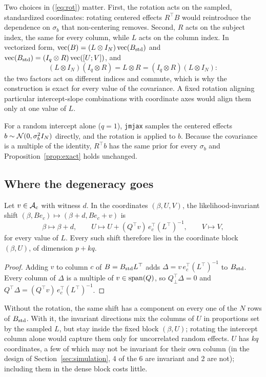 Two choices in (\ref{eq:rot}) matter. First, the rotation acts on the
sampled, standardized coordinates: rotating centered effects $R^{\top} B$
would reintroduce the dependence on $\sigma_b$ that non-centering
removes. Second, $R$ acts on the subject index, the same for every column,
while $L$ acts on the column index. In vectorized form, $\operatorname{vec}(B) = (L \otimes I_N)
\operatorname{vec}(B_{\mathrm{std}})$ and $\operatorname{vec}(B_{\mathrm{std}}) = (I_q \otimes
R)\operatorname{vec}([U; V])$, and
\[
(L \otimes I_N)(I_q \otimes R) = L \otimes R = (I_q \otimes R)(L \otimes I_N):
\]
the two factors act on different indices and commute, which is why the
construction is exact for every value of the covariance. A fixed rotation
aligning particular intercept-slope combinations with coordinate axes
would align them only at one value of $L$.

For a random intercept alone ($q = 1$), \texttt{jmjax} samples the
centered effects $b \sim \mathcal{N}(0, \sigma_b^2 I_N)$ directly, and the rotation
is applied to $b$. Because the covariance is a multiple of the identity,
$R^{\top} b$ has the same prior for every $\sigma_b$ and
Proposition~\ref{prop:exact} holds unchanged.

\subsection{Where the degeneracy goes}

\begin{lemma}[Localization]\label{lem:local}
Let $v \in \mathcal{A}_c$ with witness $d$. In the coordinates
$(\beta, U, V)$, the likelihood-invariant shift $(\beta, B e_c) \mapsto
(\beta + d, B e_c + v)$ is
\[
\beta \mapsto \beta + d, \qquad
U \mapsto U + (Q^{\top} v)\, e_c^{\top} (L^{\top})^{-1}, \qquad
V \mapsto V,
\]
for every value of $L$. Every such shift therefore lies in the coordinate
block $(\beta, U)$, of dimension $p + kq$.
\end{lemma}

\begin{proof}
Adding $v$ to column $c$ of $B = B_{\mathrm{std}} L^{\top}$ adds $\Delta = v\,
e_c^{\top} (L^{\top})^{-1}$ to $B_{\mathrm{std}}$. Every column of $\Delta$ is a
multiple of $v \in \operatorname{span}(Q)$, so $Q_{\perp}^{\top} \Delta = 0$ and
$Q^{\top} \Delta = (Q^{\top} v)\, e_c^{\top} (L^{\top})^{-1}$.
\end{proof}

Without the rotation, the same shift has a component on every one of the
$N$ rows of $B_{\mathrm{std}}$. With it, the invariant directions mix the columns of
$U$ in proportions set by the sampled $L$, but stay inside the fixed block
$(\beta, U)$; rotating the intercept column alone would capture them only
for uncorrelated random effects. $U$ has $kq$ coordinates, a few of which
may not be invariant for their own column (in the design of
Section~\ref{sec:simulation}, 4 of the 6 are invariant and 2 are not); including them in the dense
block costs little.

